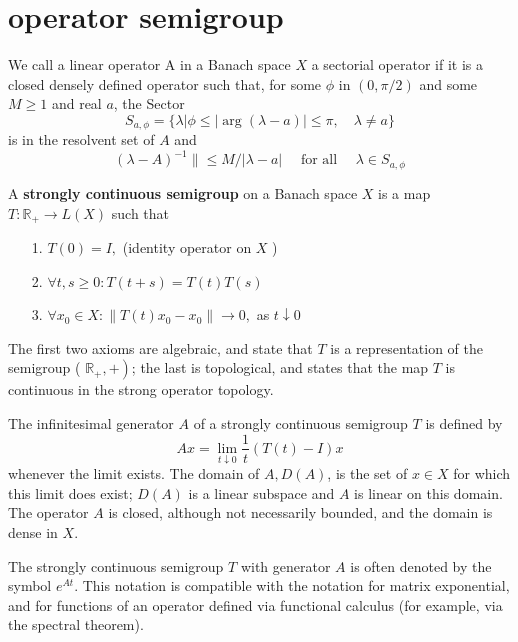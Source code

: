 \section{operator semigroup}

\begin{definition}
	
 We call a linear operator A in a Banach space $X$ a sectorial operator if it is a closed densely defined operator such that, for some $\phi $ in $(0, \pi / 2)$ and some $M \geq 1$ and real $a$, the
	Sector
	$$
	S_{a, \phi}=\{\lambda|\phi \leq| \arg (\lambda-a) \mid \leq \pi, \quad \lambda \neq a\}
	$$
	is in the resolvent set of $A$ and
	$$
	(\lambda-A)^{-1} \| \leq M /|\lambda-a| \quad \text { for all } \quad \lambda \in S_{a, \phi}
	$$
\end{definition}
\begin{definition}
	
	A \textbf{strongly continuous semigroup} on a Banach space $X$ is a map $T: \mathbb{R}_{+} \rightarrow L(X)$ such that
	\begin{itemize}
		\item [1.] $T(0)=I,$ (identity operator on $X$ )
		\item [2.] $\forall t, s \geq 0: T(t+s)=T(t) T(s)$
		\item [3.] $\forall x_{0} \in X:\left\|T(t) x_{0}-x_{0}\right\| \rightarrow 0,$ as $t \downarrow 0$
	\end{itemize}
	The first two axioms are algebraic, and state that $T$ is a representation of the semigroup ( $\left.\mathbb{R}_{+},+\right)$; the last is topological, and states that the map $T$ is continuous in the strong operator topology.

\end{definition}

The infinitesimal generator $A$ of a strongly continuous semigroup $T$ is defined by
$$
A x=\lim _{t \downarrow 0} \frac{1}{t}(T(t)-I) x
$$
whenever the limit exists. The domain of $A, D(A)$, is the set of $x \in X$ for which this limit does exist; $D(A)$ is a linear subspace and $A$ is linear on this domain.  The operator $A$ is closed, although not necessarily bounded, and the domain is dense in $X.$

The strongly continuous semigroup $T$ with generator $A$ is often denoted by the symbol $e^{A t}$. This notation is compatible with the notation for matrix exponential, and for functions of an operator defined via functional calculus (for example, via the spectral theorem).




